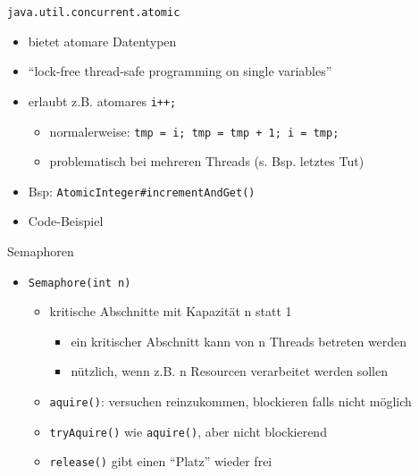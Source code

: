 \documentclass[18pt]{beamer}
\begin{document}
	\begin{frame}{\texttt{java.util.concurrent.atomic}}
		\begin{itemize}
			\item bietet atomare Datentypen
			\item \enquote{lock-free thread-safe programming on single variables}
			\item erlaubt z.B. atomares \texttt{i++;}
			\begin{itemize}
				\item normalerweise: \texttt{tmp = i; tmp = tmp + 1; i = tmp;}
				\item problematisch bei mehreren Threads (s. Bsp. letztes Tut)
			\end{itemize}
			\item Bsp: \texttt{AtomicInteger\#incrementAndGet()}
			\pause \item Code-Beispiel
		\end{itemize}
	\end{frame}

	\begin{frame}{Semaphoren}
		\begin{itemize}
			\item \texttt{Semaphore(int n)}
			\begin{itemize}
				\item kritische Abschnitte mit Kapazität n statt 1
				\begin{itemize}
					\item ein kritischer Abschnitt kann von n Threads betreten werden
					\item nützlich, wenn z.B. n Resourcen verarbeitet werden sollen
				\end{itemize}
				\item \texttt{aquire()}: versuchen reinzukommen, blockieren falls nicht möglich
				\item \texttt{tryAquire()} wie \texttt{aquire()}, aber nicht blockierend
				\item \texttt{release()} gibt einen \enquote{Platz} wieder frei
			\end{itemize} 
		\end{itemize}
	\end{frame}
	
\end{document}

